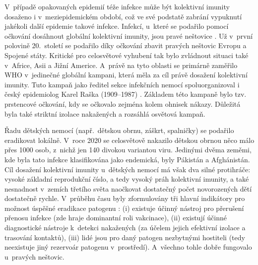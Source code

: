 V~případě opakovaných epidemií téže infekce může být kolektivní imunity dosaženo i v~meziepidemickém období, což ve své podstatě zabrání vypuknutí jakékoli další epidemie takové infekce. Infekcí, u~které se podařilo pomocí očkování dosáhnout globální kolektivní imunity, jsou pravé neštovice \cite{smallpox1}. Už v~první polovině 20.\ století se podařilo díky očkování zbavit pravých neštovic Evropu a Spojené státy. Kritické pro celosvětové vyhubení tak bylo zvládnout situaci také v~Africe, Asii a Jižní Americe. A~právě na tyto oblasti se primárně zaměřilo WHO v~jedinečné globální kampani, která měla za cíl právě dosažení kolektivní imunity. Tuto kampaň jako ředitel sekce infekčních nemocí spoluorganizoval i český epidemiolog Karel Raška (1909--1987) \cite{smallpox2}. Základem této kampaně bylo tzv. prstencové očkování, kdy se očkovalo zejména kolem ohnisek nákazy. Důležitá byla také striktní izolace nakažených a rozsáhlá osvětová kampaň.

Řadu dětských nemocí (např.\ dětskou obrnu, záškrt, spalničky) se podařilo eradikovat lokálně. V~roce 2020 se celosvětově nakazilo dětskou obrnou něco málo přes 1000 osob, z~nichž jen 140 divokou variantou viru. Jedinými dvěma zeměmi, kde byla tato infekce klasifikována jako endemická, byly Pákistán a Afghánistán. Cíl dosažení kolektivní imunity u~dětských nemocí má však dva silné protihráče: vysoké základní reprodukční číslo, a tedy vysoký práh kolektivní imunity, a také nesnadnost v~zemích třetího světa naočkovat dostatečný počet novorozených dětí dostatečně rychle. V~průběhu času byly zformulovány tři hlavní indikátory pro možnost úspěšné eradikace patogenu \cite{Dowdle1999}: (i) existuje účinný nástroj pro přerušení přenosu infekce (zde hraje dominantní roli vakcinace), (ii) existují účinné diagnostické nástroje k~detekci nakažených (za účelem jejich efektivní izolace a trasování kontaktů), (iii) lidé jsou pro daný patogen nezbytnými hostiteli (tedy neexistuje jiný rezervoár patogenu v~prostředí). A~všechno tohle dobře fungovalo u~pravých neštovic.

